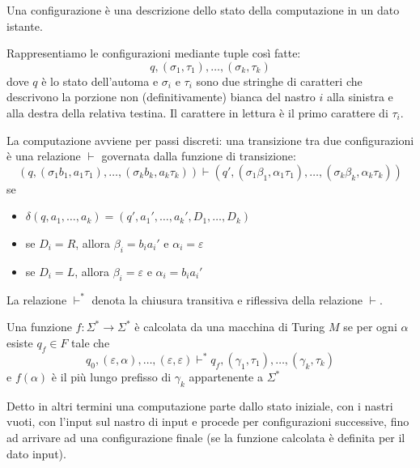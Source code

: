Una configurazione è una descrizione dello stato della computazione in un dato istante.

Rappresentiamo le configurazioni mediante tuple così fatte:
\begin{equation*}
    q, (\sigma_{1},\tau_{1}),\dotsc,(\sigma_{k},\tau_{k})
\end{equation*}
dove $q$ è lo stato dell'automa e $\sigma_{i}$ e $\tau_{i}$ sono due stringhe di caratteri che
descrivono la porzione non (definitivamente) bianca del nastro $i$ alla sinistra e alla destra della
relativa testina. Il carattere in lettura è il primo carattere di $\tau_{i}$.

La computazione avviene per passi discreti: una transizione tra due configurazioni è una relazione
$\vdash$ governata dalla funzione di transizione:
\begin{equation*}
    (q,(\sigma_{1}b_{1},a_{1}\tau_{1}),\dotsc,(\sigma_{k}b_{k},a_{k}\tau_{k})) \vdash
    (q',(\sigma_{1}\beta_{1},\alpha_{1}\tau_{1}),\dotsc,(\sigma_{k}\beta_{k},\alpha_{k}\tau_{k}))
\end{equation*}
se
\begin{itemize}
    \item $\delta(q,a_{1},\dotsc,a_{k}) = (q',a_{1}',\dotsc,a_{k}',D_{1},\dotsc,D_{k})$
    \item se $D_{i} = R$, allora $\beta_{i} = b_{i}a_{i}'$ e $\alpha_{i} = \varepsilon$
    \item se $D_{i} = L$, allora $\beta_{i} = \varepsilon$ e $\alpha_{i} = b_{i}a_{i}'$
\end{itemize}

La relazione $\vdash^{*}$ denota la chiusura transitiva e riflessiva della relazione $\vdash$.

\begin{defn}
    Una funzione $f: \Sigma^{*} \to \Sigma^{*}$ è calcolata da una macchina di Turing $M$ se per
    ogni $\alpha$ esiste $q_{f} \in F$ tale che
    \begin{equation*}
        q_{0}, (\varepsilon,\alpha),\dotsc,(\varepsilon,\varepsilon) \vdash^{*} q_{f},
        (\gamma_{1},\tau_{1}),\dotsc,(\gamma_{k},\tau_{k})
    \end{equation*}
    e $f(\alpha)$ è il più lungo prefisso di $\gamma_{k}$ appartenente a $\Sigma^{*}$
\end{defn}

Detto in altri termini una computazione parte dallo stato iniziale, con i nastri vuoti, con l'input
sul nastro di input e procede per configurazioni successive, fino ad arrivare ad una configurazione
finale (se la funzione calcolata è definita per il dato input).

